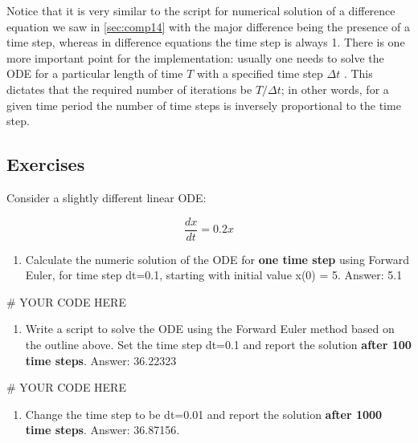 \documentclass[
  letterpaper,
  DIV=11,
  numbers=noendperiod]{scrreprt}
\newenvironment{Shaded}{\begin{snugshade}}{\end{snugshade}}
\newcommand{\CommentTok}[1]{\textcolor[rgb]{0.37,0.37,0.37}{#1}}
\providecommand{\tightlist}{%
  \setlength{\itemsep}{0pt}\setlength{\parskip}{0pt}}\usepackage{longtable,booktabs,array}
\begin{document}
Notice that it is very similar to the script for numerical solution of a
difference equation we saw in \ref{sec:comp14} with the major difference
being the presence of a time step, whereas in difference equations the
time step is always 1. There is one more important point for the
implementation: usually one needs to solve the ODE for a particular
length of time \(T\) with a specified time step \(\Delta t\) . This
dictates that the required number of iterations be \(T/\Delta t\); in
other words, for a given time period the number of time steps is
inversely proportional to the time step.

\hypertarget{exercises-25}{%
\subsection{Exercises}\label{exercises-25}}

Consider a slightly different linear ODE:

\[
\frac{dx}{dt} =  0.2 x 
\]

\begin{enumerate}
\def\labelenumi{\arabic{enumi}.}
\tightlist
\item
  Calculate the numeric solution of the ODE for \textbf{one time step}
  using Forward Euler, for time step dt=0.1, starting with initial value
  x(0) = 5. Answer: 5.1
\end{enumerate}

\begin{Shaded}
\begin{Highlighting}[]
\CommentTok{\# YOUR CODE HERE}
\end{Highlighting}
\end{Shaded}

\begin{enumerate}
\def\labelenumi{\arabic{enumi}.}
\setcounter{enumi}{1}
\tightlist
\item
  Write a script to solve the ODE using the Forward Euler method based
  on the outline above. Set the time step dt=0.1 and report the solution
  \textbf{after 100 time steps}. Answer: 36.22323
\end{enumerate}

\begin{Shaded}
\begin{Highlighting}[]
\CommentTok{\# YOUR CODE HERE}
\end{Highlighting}
\end{Shaded}

\begin{enumerate}
\def\labelenumi{\arabic{enumi}.}
\setcounter{enumi}{2}
\tightlist
\item
  Change the time step to be dt=0.01 and report the solution
  \textbf{after 1000 time steps}. Answer: 36.87156.
\end{enumerate}
\end{document}
